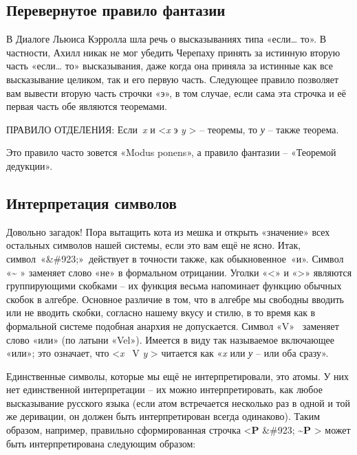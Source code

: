 \documentclass[../main.tex]{subfiles}
\begin{document}
\subsection{Перевернутое правило фантазии}

В Диалоге Льюиса Кэрролла шла речь о высказываниях типа «если\ldots{} то». В частности, Ахилл никак не мог убедить Черепаху принять за истинную вторую часть «если\ldots{} то» высказывания, даже когда она приняла за истинные как все высказывание целиком, так и его первую часть. Следующее правило позволяет вам вывести вторую часть строчки «э», в том случае, если сама эта строчка и её первая часть обе являются теоремами.

ПРАВИЛО ОТДЕЛЕНИЯ: Если~\emph{x} и \textless{}\emph{x} э \emph{y} \textgreater{} \--- теоремы, то \emph{у} \--- также теорема.

Это правило часто зовется «Modus ponens», а правило фантазии \--- «Теоремой дедукции».


\subsection{Интерпретация символов}

Довольно загадок! Пора вытащить кота из мешка и открыть «значение» всех остальных символов нашей системы, если это вам ещё не ясно. Итак, символ~«\&\#923;»~действует в точности также, как обыкновенное~«и». Символ «\textbf{\textasciitilde{}} » заменяет слово «не» в формальном отрицании. Уголки «\textless» и «\textgreater» являются группирующими скобками \--- их функция весьма напоминает функцию обычных скобок в алгебре. Основное различие в том, что в алгебре мы свободны вводить или не вводить скобки, согласно нашему вкусу и стилю, в то время как в формальной системе подобная анархия не допускается. Символ «V»~ заменяет слово «или» (по латыни «Vel»). Имеется в виду так называемое включающее «или»; это означает, что \textless{}\emph{x} ~V \emph{y} \textgreater{} читается как «\emph{x} или \emph{у} \--- или оба сразу».

Единственные символы, которые мы ещё не интерпретировали, это атомы. У них нет единственной интерпретации \--- их можно интерпретировать, как любое высказывание русского языка (если атом встречается несколько раз в одной и той же деривации, он должен быть интерпретирован всегда одинаково). Таким образом, например, правильно сформированная строчка \textless{}\textbf{P} \&\#923; \textbf{\textasciitilde P} \textgreater{} может быть интерпретирована следующим образом:
\end{document}
